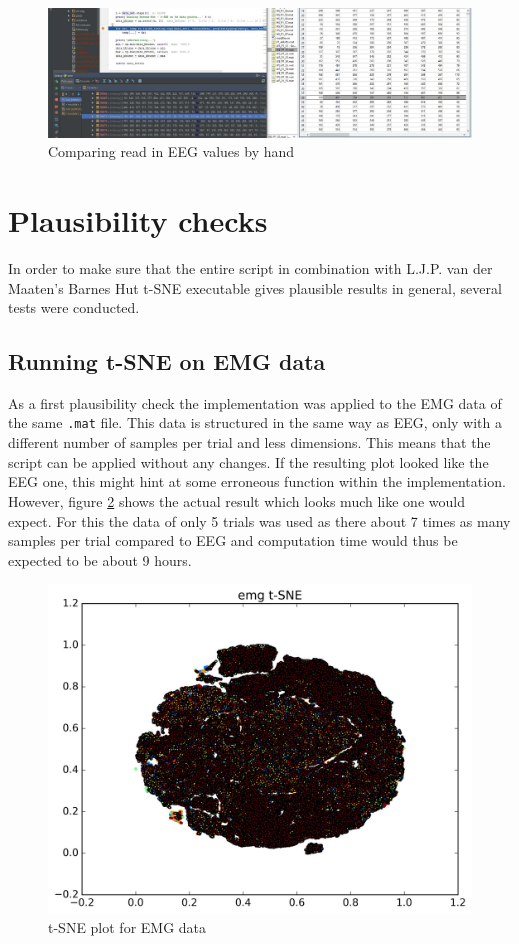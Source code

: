 \documentclass{article} %
\begin{document}
\begin{figure}[h]
	\centering
	\includegraphics[width=1.0\textwidth]{debug.jpg}
	\caption{Comparing read in EEG values by hand}
	\label{fig:debug}
\end{figure}




\section{Plausibility checks}
In order to make sure that the entire script in combination with L.J.P. van der Maaten's Barnes Hut t-SNE executable gives plausible results in general, several tests were conducted.


\subsection{Running t-SNE on EMG data}
As a first plausibility check the implementation was applied to the EMG data of the same \verb|.mat| file. This data is structured in the same way as EEG, only with a different number of samples per trial and less dimensions. This means that the script can be applied without any changes. If the resulting plot looked like the EEG one, this might hint at some erroneous function within the implementation. However, figure \ref{fig:emg} shows the actual result which looks much like one would expect. For this the data of only 5 trials was used as there about 7 times as many samples per trial compared to EEG and computation time would thus be expected to be about 9 hours.

\begin{figure}[h]
	\centering
	\includegraphics[width=1.0\textwidth]{emg.jpg}
	\caption{t-SNE plot for EMG data}
	\label{fig:emg}
\end{figure}
\end{document}

